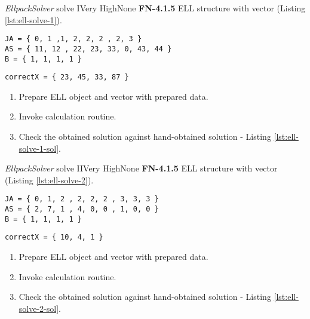 \begin{testcase}{\emph{EllpackSolver} solve I}{Very High}{None}
		{
			\textbf{FN-4.1.5}
		}
		{
			\gls{ELL} structure with vector (Listing \ref{lst:ell-solve-1}).	
		}
		\begin{lstlisting}[label={lst:ell-solve-1},caption={\gls{ELL} format and vector data example}, frame=single]
JA = { 0, 1 ,1, 2, 2, 2 , 2, 3 }
AS = { 11, 12 , 22, 23, 33, 0, 43, 44 }
B = { 1, 1, 1, 1 }
		\end{lstlisting}
		\begin{lstlisting}[label={lst:ell-solve-1-sol},caption={\gls{ELL} format and vector data example}, frame=single]
correctX = { 23, 45, 33, 87 }
		\end{lstlisting}
		
		{	
			\begin{enumerate}
				\item Prepare \gls{ELL} object and vector with prepared data.
				\item Invoke calculation routine.
				\item
				{
					Check the obtained solution against hand-obtained solution - Listing \ref{lst:ell-solve-1-sol}.
				}
			\end{enumerate}
		}
	\end{testcase}
	\begin{testcase}{\emph{EllpackSolver} solve II}{Very High}{None}
		{
			\textbf{FN-4.1.5}
		}
		{
			\gls{ELL} structure with vector (Listing \ref{lst:ell-solve-2}).	
		}
		\begin{lstlisting}[label={lst:ell-solve-2},caption={\gls{ELL} format and vector data example}, frame=single]
JA = { 0, 1, 2 , 2, 2, 2 , 3, 3, 3 }
AS = { 2, 7, 1 , 4, 0, 0 , 1, 0, 0 }
B = { 1, 1, 1, 1 }
		\end{lstlisting}
		\begin{lstlisting}[label={lst:ell-solve-2-sol},caption={\gls{ELL} format and vector data example}, frame=single]
correctX = { 10, 4, 1 }
		\end{lstlisting}
		
		{
			\begin{enumerate}
				\item Prepare \gls{ELL} object and vector with prepared data.
				\item Invoke calculation routine.
				\item
				{
					Check the obtained solution against hand-obtained solution - Listing \ref{lst:ell-solve-2-sol}.
				}
			\end{enumerate}
		}
	\end{testcase}